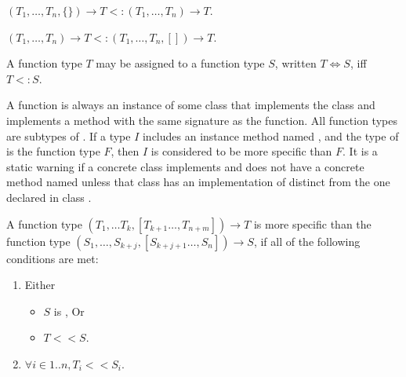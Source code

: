 \documentclass{article}
\begin{document}
$(T_1, \ldots, T_n, \{\}) \rightarrow T <: (T_1, \ldots, T_n) \rightarrow T$.

$(T_1, \ldots, T_n) \rightarrow T <: (T_1, \ldots, T_n, []) \rightarrow T$.


\LMHash{}
A function type $T$ may be assigned to a function type $S$, written $T \Longleftrightarrow S$, if{}f $T <: S$.

\LMHash{}
A function is always an instance of some class that implements the class  and implements a \CALL{} method with the same signature as the function.
All function types are subtypes of .
If a type $I$ includes an instance method named \CALL{}, and the type of \CALL{} is the function type $F$, then $I$ is considered to be more specific than $F$.
It is a static warning if a concrete class implements  and does not have a concrete method named \CALL{} unless that class has an implementation of  distinct from the one declared in class .


\LMHash{}
A function type $(T_1, \ldots T_{k}, [T_{k+1} \ldots, T_{n+m}]) \rightarrow T$ is more specific than the
function type $(S_1, \ldots, S_{k+j}, [S_{k+j+1} \ldots, S_{n}]) \rightarrow S$, if all of the following conditions are met:
\begin{enumerate}
\item Either
\begin{itemize}
\item $S$ is \VOID{}, Or
\item $T << S$.
\end{itemize}
\item $\forall i \in 1 .. n, T_i << S_i$.
\end{enumerate}
\end{document}
